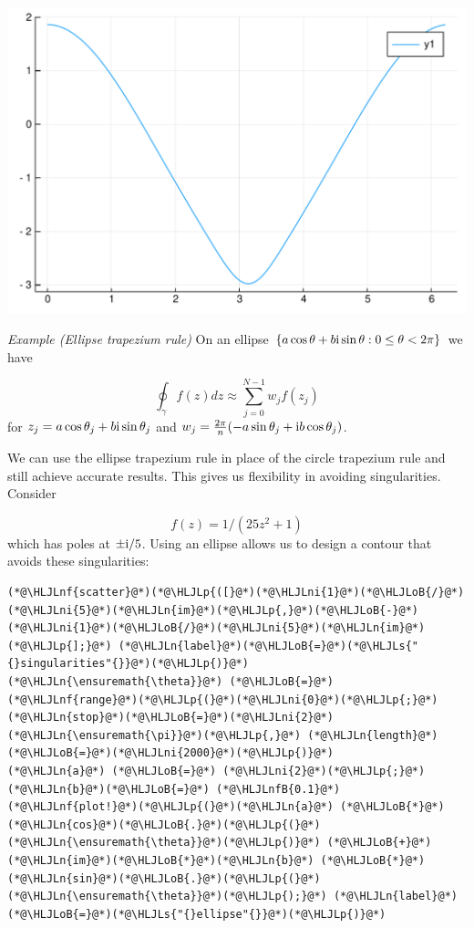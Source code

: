 \documentclass[12pt,a4paper]{article}
\newcommand{\HLJLn}[1]{#1}
\newcommand{\HLJLnf}[1]{\textcolor[RGB]{66,102,213}{#1}}
\newcommand{\HLJLs}[1]{\textcolor[RGB]{201,61,57}{#1}}
\newcommand{\HLJLnfB}[1]{\textcolor[RGB]{59,151,46}{#1}}
\newcommand{\HLJLni}[1]{\textcolor[RGB]{59,151,46}{#1}}
\newcommand{\HLJLoB}[1]{\textcolor[RGB]{102,102,102}{\textbf{#1}}}
\newcommand{\HLJLp}[1]{#1}
\def\I{ {\rm i} }
\begin{document}
\includegraphics[width=\linewidth]{figures/Lecture6_9_1.pdf}

\emph{Example (Ellipse trapezium rule)} On an ellipse $\{a \cos \theta + b \I \sin \theta : 0 \leq \theta < 2 \pi\}$ we have 

\[
\oint_\gamma f(z) dz \approx  \sum_{j=0}^{N-1} w_j f(z_j)
\]
for $z_j = a \cos \theta_j + b \I \sin \theta_j$ and $w_j = {2 \pi \over n} (-a \sin \theta_j + \I b \cos \theta_j)$.

We can use the ellipse trapezium rule in place of the circle trapezium rule and still achieve accurate results. This gives us flexibility in avoiding singularities. Consider

\[
f(z) = 1/(25z^2 + 1)
\]
which has poles at $\pm  \I/5$. Using an ellipse allows us to design a contour that avoids these singularities:


\begin{lstlisting}
(*@\HLJLnf{scatter}@*)(*@\HLJLp{([}@*)(*@\HLJLni{1}@*)(*@\HLJLoB{/}@*)(*@\HLJLni{5}@*)(*@\HLJLn{im}@*)(*@\HLJLp{,}@*)(*@\HLJLoB{-}@*)(*@\HLJLni{1}@*)(*@\HLJLoB{/}@*)(*@\HLJLni{5}@*)(*@\HLJLn{im}@*)(*@\HLJLp{];}@*) (*@\HLJLn{label}@*)(*@\HLJLoB{=}@*)(*@\HLJLs{"{}singularities"{}}@*)(*@\HLJLp{)}@*)
(*@\HLJLn{\ensuremath{\theta}}@*) (*@\HLJLoB{=}@*) (*@\HLJLnf{range}@*)(*@\HLJLp{(}@*)(*@\HLJLni{0}@*)(*@\HLJLp{;}@*) (*@\HLJLn{stop}@*)(*@\HLJLoB{=}@*)(*@\HLJLni{2}@*)(*@\HLJLn{\ensuremath{\pi}}@*)(*@\HLJLp{,}@*) (*@\HLJLn{length}@*)(*@\HLJLoB{=}@*)(*@\HLJLni{2000}@*)(*@\HLJLp{)}@*)
(*@\HLJLn{a}@*) (*@\HLJLoB{=}@*) (*@\HLJLni{2}@*)(*@\HLJLp{;}@*) (*@\HLJLn{b}@*)(*@\HLJLoB{=}@*) (*@\HLJLnfB{0.1}@*)
(*@\HLJLnf{plot!}@*)(*@\HLJLp{(}@*)(*@\HLJLn{a}@*) (*@\HLJLoB{*}@*) (*@\HLJLn{cos}@*)(*@\HLJLoB{.}@*)(*@\HLJLp{(}@*)(*@\HLJLn{\ensuremath{\theta}}@*)(*@\HLJLp{)}@*) (*@\HLJLoB{+}@*) (*@\HLJLn{im}@*)(*@\HLJLoB{*}@*)(*@\HLJLn{b}@*) (*@\HLJLoB{*}@*) (*@\HLJLn{sin}@*)(*@\HLJLoB{.}@*)(*@\HLJLp{(}@*)(*@\HLJLn{\ensuremath{\theta}}@*)(*@\HLJLp{);}@*) (*@\HLJLn{label}@*)(*@\HLJLoB{=}@*)(*@\HLJLs{"{}ellipse"{}}@*)(*@\HLJLp{)}@*)
\end{lstlisting}
\end{document}
